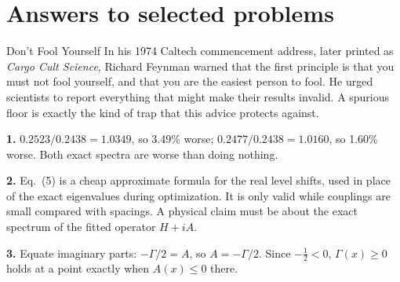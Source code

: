 \begin{problemlist}



\end{problemlist}

\section{Answers to selected problems}
\begin{didyouknow}{Don't Fool Yourself}
In his 1974 Caltech commencement address, later printed as \emph{Cargo Cult Science}, Richard Feynman warned that the first principle is that you must not fool yourself, and that you are the easiest person to fool. He urged scientists to report everything that might make their results invalid. A spurious floor is exactly the kind of trap that this advice protects against.
\end{didyouknow}

\textbf{1.} $0.2523/0.2438=1.0349$, so 3.49\% worse; $0.2477/0.2438=1.0160$, so 1.60\% worse. Both exact spectra are worse than doing nothing.

\textbf{2.} Eq.~(5) is a cheap approximate formula for the real level shifts, used in place of the exact eigenvalues during optimization. It is only valid while couplings are small compared with spacings. A physical claim must be about the exact spectrum of the fitted operator $H+iA$.

\textbf{3.} Equate imaginary parts: $-\Gamma/2=A$, so $A=-\Gamma/2$. Since $-\tfrac12<0$, $\Gamma(x)\ge0$ holds at a point exactly when $A(x)\le0$ there.


